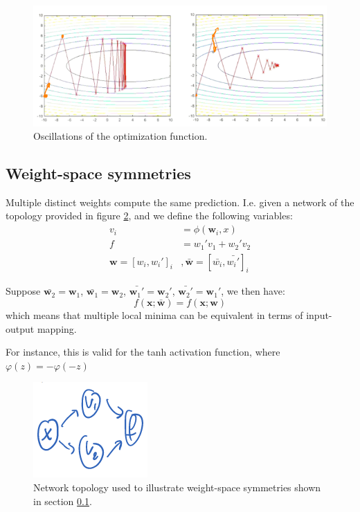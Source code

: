 \documentclass[a4paper,10pt,twoside]{article}
\begin{document}
\begin{figure}
    \centering
    \includegraphics[width=.8\textwidth]{figures/oscillation-momentum.png}
    \caption{Oscillations of the optimization function.}
    \label{oscillation-momentum}
\end{figure}

\subsection{Weight-space symmetries}\label{weight-space-symmetries}

Multiple distinct weights compute the same prediction. I.e. given a network of the topology provided in figure \ref{weight-space-symmetries-fig}, and we define the following variables:
\begin{align*}
    v_i &= \phi(\mathbf{w}_i,x)\\
    f &= w_1'v_1+w_2'v_2\\
    \mathbf{w}=[w_i,w_i']_i&,\bar{\mathbf{w}}=[\bar{w_i},\bar{w_i'}]_i
\end{align*}

Suppose $\bar{\mathbf{w}_2}=\mathbf{{w}}_1$, $\bar{\mathbf{w}_1}=\mathbf{{w}}_2$, $\bar{\mathbf{w}_1'}=\mathbf{{w}}_2'$, $\bar{\mathbf{w}_2'}=\mathbf{{w}}_1'$, we then have:
\begin{equation*}
    f(\mathbf{x};\bar{\mathbf{w}})=f(\mathbf{x};\mathbf{w})
\end{equation*}
which means that multiple local minima can be equivalent in terms of input-output mapping.

For instance, this is valid for the tanh activation function, where $\varphi(z)=-\varphi(-z)$

\begin{figure}
    \centering
    \includegraphics[]{figures/weight-symmetries.png}
    \caption{Network topology used to illustrate weight-space symmetries shown in section \ref{weight-space-symmetries}.}
    \label{weight-space-symmetries-fig}
\end{figure}
\end{document}
